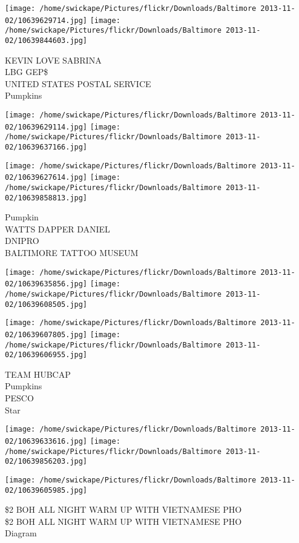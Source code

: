 \documentclass[10pt,letterpaper]{article}
\begin{document}
\texttt{[image: /home/swickape/Pictures/flickr/Downloads/Baltimore 2013-11-02/10639629714.jpg]}
\texttt{[image: /home/swickape/Pictures/flickr/Downloads/Baltimore 2013-11-02/10639844603.jpg]}

KEVIN LOVE SABRINA\\
LBG GEP\$\\
UNITED STATES POSTAL SERVICE\\
Pumpkins
\pagebreak

\texttt{[image: /home/swickape/Pictures/flickr/Downloads/Baltimore 2013-11-02/10639629114.jpg]}
\texttt{[image: /home/swickape/Pictures/flickr/Downloads/Baltimore 2013-11-02/10639637166.jpg]}

\texttt{[image: /home/swickape/Pictures/flickr/Downloads/Baltimore 2013-11-02/10639627614.jpg]}
\texttt{[image: /home/swickape/Pictures/flickr/Downloads/Baltimore 2013-11-02/10639858813.jpg]}

Pumpkin\\
WATTS DAPPER DANIEL\\
DNIPRO\\
BALTIMORE TATTOO MUSEUM
\pagebreak

\texttt{[image: /home/swickape/Pictures/flickr/Downloads/Baltimore 2013-11-02/10639635856.jpg]}
\texttt{[image: /home/swickape/Pictures/flickr/Downloads/Baltimore 2013-11-02/10639608505.jpg]}

\texttt{[image: /home/swickape/Pictures/flickr/Downloads/Baltimore 2013-11-02/10639607805.jpg]}
\texttt{[image: /home/swickape/Pictures/flickr/Downloads/Baltimore 2013-11-02/10639606955.jpg]}

TEAM HUBCAP\\
Pumpkins\\
PESCO\\
Star
\pagebreak

\texttt{[image: /home/swickape/Pictures/flickr/Downloads/Baltimore 2013-11-02/10639633616.jpg]}
\texttt{[image: /home/swickape/Pictures/flickr/Downloads/Baltimore 2013-11-02/10639856203.jpg]}

\vspace{0.25in}
\texttt{[image: /home/swickape/Pictures/flickr/Downloads/Baltimore 2013-11-02/10639605985.jpg]}

\$2 BOH ALL NIGHT WARM UP WITH VIETNAMESE PHO\\
\$2 BOH ALL NIGHT WARM UP WITH VIETNAMESE PHO\\
Diagram
\pagebreak
\end{document}
